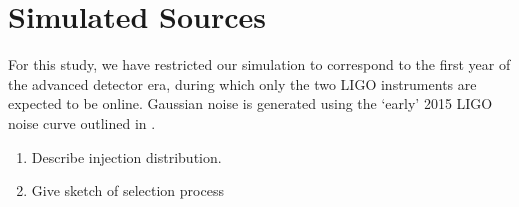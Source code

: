 \section{Simulated Sources}

For this study, we have restricted our simulation to correspond to the first year of the advanced detector era, during which only the two LIGO instruments are expected to be online.  Gaussian noise is generated using the `early' 2015 LIGO noise curve outlined in .
\begin{enumerate}
\item Describe injection distribution.
\item Give sketch of selection process
\end{enumerate}